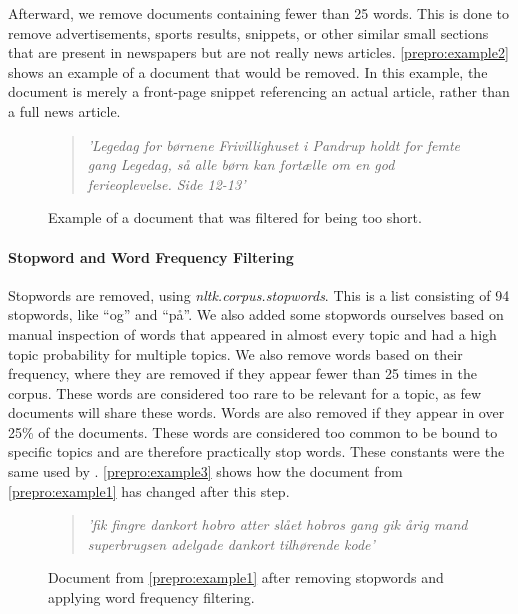 Afterward, we remove documents containing fewer than 25 words.
This is done to remove advertisements, sports results, snippets, or other similar small sections that are present in newspapers but are not really news articles.
\autoref{prepro:example2} shows an example of a document that would be removed. In this example, the document is merely a front-page snippet referencing an actual article, rather than a full news article.
\begin{figure}[h]
	\begin{framed}
		\begin{quote}
			\textit{
				'Legedag for børnene Frivillighuset i Pandrup holdt for femte gang Legedag, så alle børn kan fortælle om en god ferieoplevelse. Side 12-13'
			}
		\end{quote}
	\end{framed}
	\caption{Example of a document that was filtered for being too short.}
	\label{prepro:example2}
\end{figure}


\paragraph{Stopword and Word Frequency Filtering}
Stopwords are removed, using \emph{nltk.corpus.stopwords}. 
This is a list consisting of 94 stopwords, like ``og'' and ``på''.
We also added some stopwords ourselves based on manual inspection of words that appeared in almost every topic and had a high topic probability for multiple topics.
We also remove words based on their frequency, where they are removed if they appear fewer than 25 times in the corpus.
These words are considered too rare to be relevant for a topic, as few documents will share these words.
Words are also removed if they appear in over 25\% of the documents.
These words are considered too common to be bound to specific topics and are therefore practically stop words.
These constants were the same used by \cite{quanti}.
\autoref{prepro:example3} shows how the document from \autoref{prepro:example1} has changed after this step.
\begin{figure}[h]
	\begin{framed}
		\begin{quote}
			\textit{
				'fik fingre dankort hobro atter slået hobros gang gik årig mand superbrugsen adelgade dankort tilhørende kode'
			}
		\end{quote}
	\end{framed}
	\caption{Document from \autoref{prepro:example1} after removing stopwords and applying word frequency filtering.}
	\label{prepro:example3}
\end{figure}


